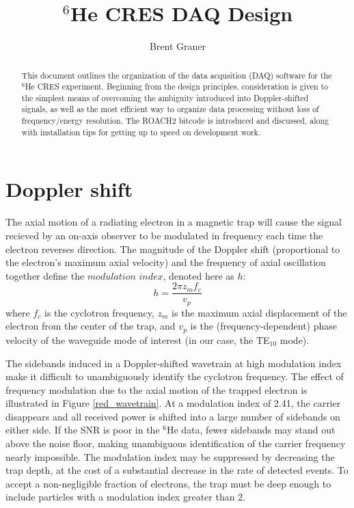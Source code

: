 \documentclass[a4paper,10pt]{article}
\title{$^6$He CRES DAQ Design}
\author{Brent Graner}
\begin{document}
\maketitle

\begin{abstract}
This document outlines the organization of the data acqusition (DAQ) software for the $^6$He CRES experiment. Beginning from the design principles, consideration is given to the simplest means of overcoming the ambiguity introduced into Doppler-shifted signals, as well as the most efficient way to organize data processing without loss of frequency/energy resolution. The ROACH2 bitcode is introduced and discussed, along with installation tips for getting up to speed on development work.
\end{abstract}

\section{Doppler shift}
The axial motion of a radiating electron in a magnetic trap will cause the signal recieved by an on-axis observer to be modulated in frequency each time the electron reverses direction. The magnitude of the Doppler shift (proportional to the electron's maximum axial velocity) and the frequency of axial oscillation together define the $\textit{modulation index}$, denoted here as $h$:
\begin{equation}
 h = \frac{2\pi z_mf_c}{v_p}
\end{equation}
where $f_c$ is the cyclotron frequency, $z_m$ is the maximum axial displacement of the electron from the center of the trap, and $v_p$ is the (frequency-dependent) phase velocity of the waveguide mode of interest (in our case, the TE$_{10}$ mode).

The sidebands induced in a Doppler-shifted wavetrain at high modulation index make it difficult to unambiguously identify the cyclotron frequency. The effect of frequency modulation due to the axial motion of the trapped electron is illustrated in Figure \ref{red_wavetrain}. At a modulation index of 2.41, the carrier disappears and all received power is shifted into a large number of sidebands on either side. If the SNR is poor in the $^6$He data, fewer sidebands may stand out above the noise floor, making unambiguous identification of the carrier frequency nearly impossible. The modulation index may be suppressed by decreasing the trap depth, at the cost of a substantial decrease in the rate of detected events. To accept a non-negligible fraction of electrons, the trap must be deep enough to include particles with a modulation index greater than 2. 
\end{document}
